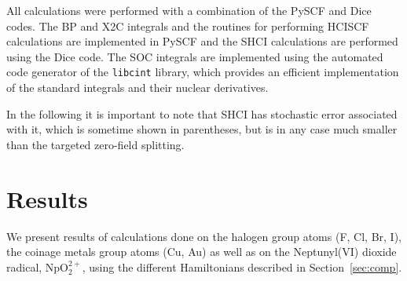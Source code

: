 \documentclass[10pt,aps,prb,twocolumn,amsmath,amssymb,superscriptaddress]{revtex4-1}
\begin{document}
All calculations were performed with a combination of the PySCF\cite{Sun2017} and Dice codes. The BP and X2C integrals and the routines for performing HCISCF calculations are implemented in PySCF and the SHCI calculations are performed using the Dice code. The SOC integrals are implemented using the automated code generator of the \texttt{libcint} library\cite{Sun2015LibcintAE}, which provides an efficient implementation of the standard integrals and their nuclear derivatives. 

In the following it is important to note that SHCI has stochastic error associated with it, which is sometime shown in parentheses, but is in any case much smaller than the targeted zero-field splitting.

\section{Results}

We present results of calculations done on the halogen group atoms (F, Cl, Br, I), the coinage metals group atoms (Cu, Au) as well as on the Neptunyl(VI) dioxide radical, NpO$_2^{2+}$, using the different Hamiltonians described in Section~\ref{sec:comp}.
\end{document}
